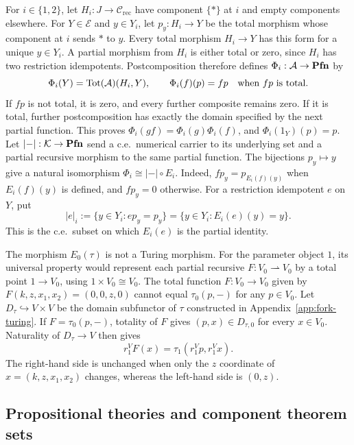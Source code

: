 For $i\in\{1,2\}$, let $H_i:J\to\mathcal C_{\mathrm{rec}}$
have component $\{*\}$ at $i$ and empty components elsewhere.
For $Y\in\mathcal E$ and $y\in Y_i$, let $p_y:H_i\to Y$ be the total morphism
whose component at $i$ sends $*$ to $y$. Every total morphism
$H_i\to Y$ has this form for a unique $y\in Y_i$. A partial
morphism from $H_i$ is either total or zero, since $H_i$ has
two restriction idempotents. Postcomposition therefore defines
$\Phi_i:\mathcal A\to\mathbf{Pfn}$ by
\[
 \Phi_i(Y)=\operatorname{Tot}(\mathcal A)(H_i,Y),\qquad
 \Phi_i(f)(p)=fp\quad\hbox{when }fp\hbox{ is total}.
\]
If $fp$ is not total, it is zero, and every further composite
remains zero. If it is total, further postcomposition has exactly
the domain specified by the next partial function. This proves
$\Phi_i(gf)=\Phi_i(g)\Phi_i(f)$, and $\Phi_i(1_Y)(p)=p$.
Let $\lvert-\rvert:\mathcal K\to\mathbf{Pfn}$ send a c.e.\ numerical carrier to its
underlying set and a partial recursive morphism to the same partial
function. The bijections $p_y\mapsto y$ give a natural isomorphism
$\Phi_i\cong\lvert-\rvert\circ E_i$.
Indeed, $fp_y=p_{E_i(f)(y)}$ when $E_i(f)(y)$ is defined, and $fp_y=0$
otherwise.
For a restriction idempotent $e$ on $Y$, put
\begin{equation}\label{eq:probe-domain}
 |e|_i:=\{y\in Y_i:ep_y=p_y\}
       =\{y\in Y_i:E_i(e)(y)=y\}.
\end{equation}
This is the c.e.\ subset on which $E_i(e)$ is the partial identity.

The morphism $E_0(\tau)$ is not a Turing morphism. For the parameter
object $1$, its universal property would represent each partial recursive
$F:V_0\rightharpoonup V_0$ by a total point $1\to V_0$, using
$1\times V_0\cong V_0$. The total function $F:V_0\to V_0$ given by
$F(k,z,x_1,x_2)=(0,0,z,0)$ cannot equal $\tau_0(p,-)$ for any $p\in V_0$.
Let $D_\tau\hookrightarrow V\times V$ be the domain subfunctor of
$\tau$ constructed in Appendix~\ref{app:fork-turing}.
If $F=\tau_0(p,-)$, totality of $F$ gives $(p,x)\in D_{\tau,0}$
for every $x\in V_0$. Naturality of $D_\tau\to V$ then gives
\[
 r_1^V F(x)=\tau_1(r_1^Vp,r_1^Vx).
\]
The right-hand side is unchanged when only the $z$ coordinate
of $x=(k,z,x_1,x_2)$ changes, whereas the left-hand side is $(0,z)$.

\subsection{Propositional theories and component theorem sets}
\label{subsec:fork-propositional-theories}

